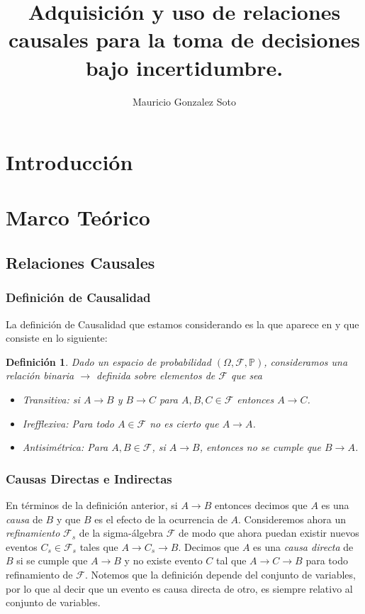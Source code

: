 \documentclass[11pt]{article}
\title{Adquisición y uso de relaciones causales para la toma de decisiones bajo incertidumbre.}
\author{Mauricio Gonzalez Soto}
\theoremstyle{plain}
\newtheorem{defi}[teo]{Definición}
\begin{document}
\maketitle
\section{Introducción}

\section{Marco Teórico}
	\subsection{Relaciones Causales}
		\subsubsection{Definición de Causalidad}
		La definición de Causalidad que estamos considerando es la que aparece en \cite{spirtes2000causation} y que consiste en lo siguiente:
		\begin{defi}
		Dado un espacio de probabilidad $(\Omega, \mathcal{F},\mathbb{P})$, consideramos una relación binaria $\to$ definida sobre elementos de $\mathcal{F}$ que sea
		\begin{itemize}
		\item Transitiva: si $A \to B$ y $B \to C$ para $A,B,C \in \mathcal{F}$ entonces $A \to C$.
		\item Irefflexiva: Para todo $A \in \mathcal{F}$ no es cierto que $A \to A$.
		\item Antisimétrica: Para $A, B \in \mathcal{F}$, si $A \to B$, entonces no se cumple que $B \to A$.
		\end{itemize}
		\end{defi}
		\subsubsection{Causas Directas e Indirectas}
		En términos de la definición anterior, si $A \to B$ entonces decimos que $A$ es una \textit{causa} de $B$ y que $B$ es el efecto de la ocurrencia de $A$. Consideremos ahora un \textit{refinamiento} $\mathcal{F}_s$ de la sigma-álgebra $\mathcal{F}$ de modo que ahora puedan existir nuevos eventos $C_s \in \mathcal{F}_s$ tales que $A \to C_s \to B$. Decimos que $A$ es una \textit{causa directa} de $B$ si se cumple que $A \to B$ y no existe evento $C$ tal que $A \to C \to B$ para todo refinamiento de $\mathcal{F}$. Notemos que la definición depende del conjunto de variables, por lo que al decir que un evento es causa directa de otro, es siempre relativo al conjunto de variables. 
		
\end{document}
